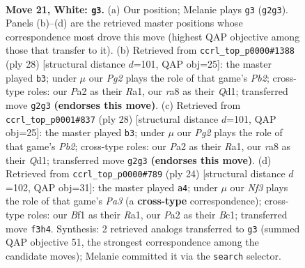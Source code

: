 \documentclass[11pt]{article}
\begin{document}
\clearpage

\begin{figure}[p]\centering
\begin{subfigure}{0.46\textwidth}\centering
\resizebox{\linewidth}{!}{%
\newchessgame
\chessboard[
  setfen={rnb1qrk1/1p5p/n1p1p3/p2p1p2/3P1P2/2NQ1N2/PPP2KPP/3R1B1R w - - 4 21},
  showmover=false,
  pgfstyle=straightmove, color=movearrow, markmove={g2-g3}
]}
\caption{}
\end{subfigure}\hfill
\begin{subfigure}{0.46\textwidth}\centering
\resizebox{\linewidth}{!}{%
\newchessgame
\chessboard[
  setfen={1rbqr1k1/1p1nppbp/p1np2p1/8/P2NP3/2N1B1PP/1PP2PB1/R2QR1K1 w - - 1 15},
  showmover=false,
  pgfstyle=straightmove, color=movearrow, markmove={b2-b3}
]}
\caption{}
\end{subfigure}
\\[4pt]
\begin{subfigure}{0.46\textwidth}\centering
\resizebox{\linewidth}{!}{%
\newchessgame
\chessboard[
  setfen={1rbqr1k1/1p1nppbp/p1np2p1/8/P2NP3/2N1B1PP/1PP2PB1/R2QR1K1 w - - 1 15},
  showmover=false,
  pgfstyle=straightmove, color=movearrow, markmove={b2-b3}
]}
\caption{}
\end{subfigure}\hfill
\begin{subfigure}{0.46\textwidth}\centering
\resizebox{\linewidth}{!}{%
\newchessgame
\chessboard[
  setfen={rn3rk1/ppq1bppp/3p1n2/3Pp3/2B5/PN1Q4/1PP2PPP/R1B2RK1 w - - 1 13},
  showmover=false,
  pgfstyle=straightmove, color=movearrow, markmove={a3-a4}
]}
\caption{}
\end{subfigure}
\caption{\textbf{Move 21, White: \texttt{g3}.} (a) Our position; Melanie plays \texttt{g3} (\texttt{g2g3}). Panels (b)--(d) are the retrieved master positions whose correspondence most drove this move (highest QAP objective among those that transfer to it). (b) Retrieved from \texttt{ccrl\_top\_p0000\#1388} (ply 28) [structural distance $d$=101, QAP obj=25]: the master played \texttt{b3}; under $\mu$ our \emph{Pg2} plays the role of that game's \emph{Pb2}; cross-type roles: our \emph{P}a2 as their \emph{R}a1, our \emph{r}a8 as their \emph{Q}d1; transferred move \texttt{g2g3} \textbf{(endorses this move)}. (c) Retrieved from \texttt{ccrl\_top\_p0001\#837} (ply 28) [structural distance $d$=101, QAP obj=25]: the master played \texttt{b3}; under $\mu$ our \emph{Pg2} plays the role of that game's \emph{Pb2}; cross-type roles: our \emph{P}a2 as their \emph{R}a1, our \emph{r}a8 as their \emph{Q}d1; transferred move \texttt{g2g3} \textbf{(endorses this move)}. (d) Retrieved from \texttt{ccrl\_top\_p0000\#789} (ply 24) [structural distance $d$=102, QAP obj=31]: the master played \texttt{a4}; under $\mu$ our \emph{Nf3} plays the role of that game's \emph{Pa3} (a \textbf{cross-type} correspondence); cross-type roles: our \emph{B}f1 as their \emph{R}a1, our \emph{P}a2 as their \emph{B}c1; transferred move \texttt{f3h4}. Synthesis: 2 retrieved analogs transferred to \texttt{g3} (summed QAP objective 51, the strongest correspondence among the candidate moves); Melanie committed it via the \texttt{search} selector.}
\label{fig:thought-m40}
\end{figure}
\end{document}
